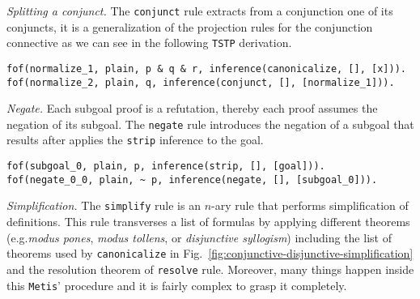 \documentclass[../main.tex]{subfiles}
\begin{document}

\textit{Splitting a conjunct.}
The \verb!conjunct! rule extracts from a conjunction one of its conjuncts, it is
a generalization of the projection rules for the conjunction connective as
we can see in the following \verb!TSTP! derivation.

\begin{verbatim}
fof(normalize_1, plain, p & q & r, inference(canonicalize, [], [x])).
fof(normalize_2, plain, q, inference(conjunct, [], [normalize_1])).
\end{verbatim}

\textit{Negate.}
Each subgoal proof is a refutation, thereby each proof assumes
the negation of its subgoal. The \verb!negate! rule
introduces the negation of a subgoal that results
after applies the \verb!strip! inference to the goal.

\begin{verbatim}
fof(subgoal_0, plain, p, inference(strip, [], [goal])).
fof(negate_0_0, plain, ~ p, inference(negate, [], [subgoal_0])).
\end{verbatim}


\textit{Simplification.} %
The \verb!simplify! rule is an $n$-ary rule that performs simplification
of definitions. This rule transverses a list of formulas by
applying different theorems (e.g.\emph{modus pones}, \emph{modus tollens},
or \emph{disjunctive syllogism}) including the list of theorems used by
\verb!canonicalize! in Fig.~\ref{fig:conjunctive-disjunctive-simplification}
and the resolution theorem of \verb!resolve! rule.
Moreover, many things happen inside this \verb!Metis!' procedure and
it is fairly complex to grasp it completely.
\end{document}

